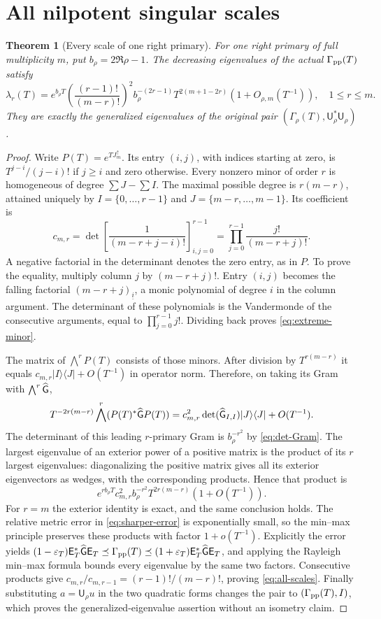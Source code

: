 \documentclass[11pt]{article}
\newtheorem{theorem}{Theorem}[section]
\newcommand{\U}{\mathsf U}\newcommand{\E}{\mathsf E}
\begin{document}
\section{All nilpotent singular scales}\label{sec:nilpotent}
\begin{theorem}[Every scale of one right primary]\label{thm:scales}
For one right primary of full multiplicity $m$, put $b_\rho=2\Re\rho-1$.
The decreasing eigenvalues of the actual $\Gamma_{\rm pp}(T)$ satisfy
\[
 \lambda_r(T)=e^{b_\rho T}
 \left(\frac{(r-1)!}{(m-r)!}\right)^2 b_\rho^{-(2r-1)}
 T^{2(m+1-2r)}(1+O_{\rho,m}(T^{-1})),\quad 1\le r\le m.
 \tag{EG42}\label{eq:all-scales}
\]
They are exactly the generalized eigenvalues of the original pair
$(\Gamma_\rho(T),\U_\rho^*\U_\rho)$.
\end{theorem}
\begin{proof}
Write $P(T)=e^{TJ_m^\uparrow}$. Its entry $(i,j)$, with indices
starting at zero, is $T^{j-i}/(j-i)!$ if $j\ge i$ and zero otherwise.
Every nonzero minor of order $r$ is homogeneous of degree
$\sum J-\sum I$. The maximal possible degree is $r(m-r)$,
attained uniquely by $I=\{0,\ldots,r-1\}$ and
$J=\{m-r,\ldots,m-1\}$. Its coefficient is
\[
 c_{m,r}=\det\left[\frac1{(m-r+j-i)!}\right]_{i,j=0}^{r-1}
                  =\prod_{j=0}^{r-1}\frac{j!}{(m-r+j)!}.
 \tag{EG43}\label{eq:extreme-minor}
\]
A negative factorial in the determinant denotes the zero entry,
as in $P$. To prove the equality, multiply column $j$ by
$(m-r+j)!$. Entry $(i,j)$ becomes the falling factorial
$(m-r+j)_{\underline i}$, a monic polynomial of degree $i$ in
the column argument. The determinant of these polynomials is the
Vandermonde of the consecutive arguments, equal to
$\prod_{j=0}^{r-1}j!$. Dividing back proves \eqref{eq:extreme-minor}.

The matrix of $\bigwedge^rP(T)$ consists of those minors. After
division by $T^{r(m-r)}$ it equals
$c_{m,r}|I\rangle\langle J|+O(T^{-1})$ in operator norm.
Therefore, on taking its Gram with $\bigwedge^r\widehat{\mathsf G}$,
\[
 T^{-2r(m-r)}\bigwedge^r(P(T)^*\widehat{\mathsf G} P(T))
 =c_{m,r}^2\det(\widehat{\mathsf G}_{I,I})|J\rangle\langle J|+O(T^{-1}).
\]
The determinant of this leading $r$-primary Gram is $b_\rho^{-r^2}$
by \eqref{eq:det-Gram}. The largest eigenvalue of an exterior power
of a positive matrix is the product of its $r$ largest eigenvalues:
diagonalizing the positive matrix gives all its exterior eigenvectors
as wedges, with the corresponding products. Hence that product is
\[
 e^{rb_\rho T}c_{m,r}^2b_\rho^{-r^2}T^{2r(m-r)}(1+O(T^{-1})).
\]
For $r=m$ the exterior identity is exact, and the same conclusion
holds. The relative metric error in \eqref{eq:sharper-error} is
exponentially small, so the min--max principle preserves these
products with factor $1+o(T^{-1})$. Explicitly the error yields
$(1-\varepsilon_T)\E_T^*\widehat\G\E_T\preceq\Gamma_{\rm pp}(T)
\preceq(1+\varepsilon_T)\E_T^*\widehat\G\E_T$, and applying
the Rayleigh min--max formula bounds every eigenvalue by the same
two factors. Consecutive products give
$c_{m,r}/c_{m,r-1}=(r-1)!/(m-r)!$, proving \eqref{eq:all-scales}.
Finally substituting $a=\U_\rho u$ in the two quadratic forms
changes the pair to $(\Gamma_{\rm pp}(T),I)$, which proves the
generalized-eigenvalue assertion without an isometry claim.
\end{proof}
\end{document}
